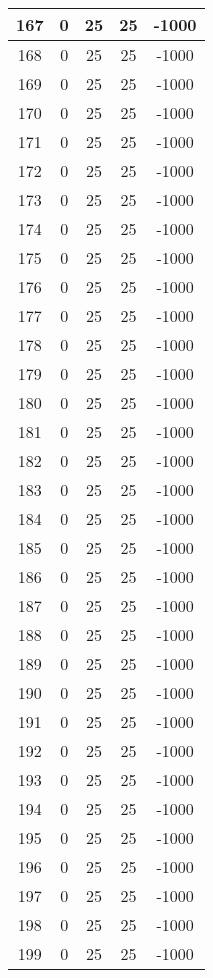 \documentclass[letterpaper, 12pt]{article}
\begin{document}
\begin{longtable}{|c|c|c|c|c|}
\hline
167 & 0 & 25 & 25 & -1000 \\
\hline
168 & 0 & 25 & 25 & -1000 \\
\hline
169 & 0 & 25 & 25 & -1000 \\
\hline
170 & 0 & 25 & 25 & -1000 \\
\hline
171 & 0 & 25 & 25 & -1000 \\
\hline
172 & 0 & 25 & 25 & -1000 \\
\hline
173 & 0 & 25 & 25 & -1000 \\
\hline
174 & 0 & 25 & 25 & -1000 \\
\hline
175 & 0 & 25 & 25 & -1000 \\
\hline
176 & 0 & 25 & 25 & -1000 \\
\hline
177 & 0 & 25 & 25 & -1000 \\
\hline
178 & 0 & 25 & 25 & -1000 \\
\hline
179 & 0 & 25 & 25 & -1000 \\
\hline
180 & 0 & 25 & 25 & -1000 \\
\hline
181 & 0 & 25 & 25 & -1000 \\
\hline
182 & 0 & 25 & 25 & -1000 \\
\hline
183 & 0 & 25 & 25 & -1000 \\
\hline
184 & 0 & 25 & 25 & -1000 \\
\hline
185 & 0 & 25 & 25 & -1000 \\
\hline
186 & 0 & 25 & 25 & -1000 \\
\hline
187 & 0 & 25 & 25 & -1000 \\
\hline
188 & 0 & 25 & 25 & -1000 \\
\hline
189 & 0 & 25 & 25 & -1000 \\
\hline
190 & 0 & 25 & 25 & -1000 \\
\hline
191 & 0 & 25 & 25 & -1000 \\
\hline
192 & 0 & 25 & 25 & -1000 \\
\hline
193 & 0 & 25 & 25 & -1000 \\
\hline
194 & 0 & 25 & 25 & -1000 \\
\hline
195 & 0 & 25 & 25 & -1000 \\
\hline
196 & 0 & 25 & 25 & -1000 \\
\hline
197 & 0 & 25 & 25 & -1000 \\
\hline
198 & 0 & 25 & 25 & -1000 \\
\hline
199 & 0 & 25 & 25 & -1000 \\
\hline
\end{longtable}
\end{document}
